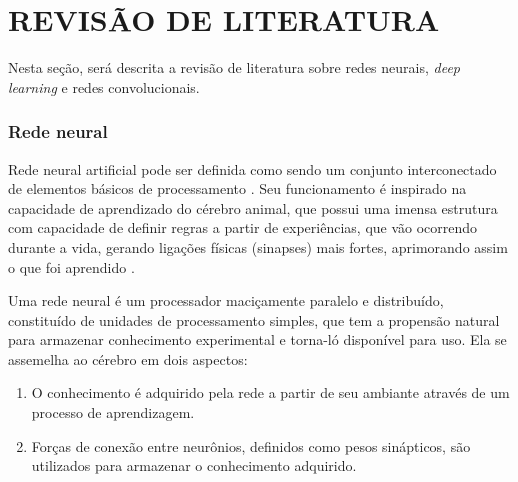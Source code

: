 
\chapter{REVISÃO DE LITERATURA}
\label{chap:fundamentacaoTeorica}

Nesta seção, será descrita a revisão de literatura sobre redes neurais, \textit{deep learning} e redes convolucionais.

\subsection{Rede neural}
Rede neural artificial pode ser definida como sendo um conjunto interconectado de elementos básicos de processamento \cite{Gurney1997}. Seu funcionamento é inspirado na capacidade de aprendizado do cérebro animal, que possui uma imensa estrutura com capacidade de definir regras a partir de experiências, que vão ocorrendo durante a vida, gerando ligações físicas (sinapses) mais fortes, aprimorando assim o que foi aprendido \cite{haykin2001}.
\begin{citacao}
  Uma rede neural é um processador maciçamente paralelo e distribuído, constituído de unidades de processamento simples, que tem a propensão natural para armazenar conhecimento experimental e torna-ló disponível para uso. Ela se assemelha ao cérebro em dois aspectos:
    \begin{enumerate}  
    \item{O conhecimento é adquirido pela rede a partir de seu ambiante através de um processo de aprendizagem.}  
    \item{Forças de conexão entre neurônios, definidos como pesos sinápticos, são utilizados para armazenar o conhecimento adquirido.}
    \end{enumerate}
   \cite{haykin2001}
\end{citacao}

